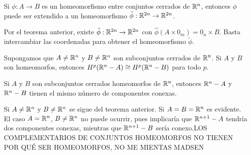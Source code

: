 \documentclass[CV.tex]{subfiles}
\begin{document}
\begin{coro}
Si $\phi:A\to B$ es un homeomorfismo entre conjuntos cerrados de $\mathbb{R}^n$, entonces $\phi$ puede ser extendido a un homeomorfismo $\tilde{\phi}:\mathbb{R}^{2n}\to \mathbb{R}^{2n}$.
\end{coro}
\begin{dem}
Por el teorema anterior, existe $\hat{\phi}:\mathbb{R}^{2n}\to\mathbb{R}^{2n}$ con $\hat{\phi}(A\times 0_m)=0_n\times B$. Basta intercambiar las coordenadas para obtener el homeomorfismo $\tilde{\phi}$. \QED
\end{dem}

\begin{teorema}
Supongamos que $A\neq\mathbb{R}^n$ y $B\neq\mathbb{R}^n$ son subconjuntos cerrados de $\mathbb{R}^n$. Si $A$ y $B$ son homeomorfos, entonces $H^p(\mathbb{R}^n-A)\cong H^p(\mathbb{R}^n-B)$ para todo $p$.
\end{teorema}
\begin{dem}
\QED
\end{dem}

\begin{coro}
Si $A$ y $B$ son subconjuntos cerrados homeomorfos de $\mathbb{R}^n$, entonces $\mathbb{R}^n-A$ y $\mathbb{R}^n-B$ tienen el mismo número de componentes conexas. 
\end{coro}
\begin{dem}
Si $A\neq\mathbb{R}^n$ y $B\neq\mathbb{R}^n$ se sigue del teorema anterior. Si $A=B=\mathbb{R}^n$ es evidente. El caso $A=\mathbb{R}^n$, $B\neq\mathbb{R}^n$ no puede ocurrir, pues implicaría que $\mathbb{R}^{n+1}-A$ tendría dos componentes conexas, mientras que $\mathbb{R}^{n+1}-B$ sería conexo.\QED LOS COMPLEMENTARIOS DE CONJUNTOS HOMEOMORFOS NO TIENEN POR QUÉ SER HOMEOMORFOS, NO ME MIENTAS MADSEN
\end{dem}
\end{document}
